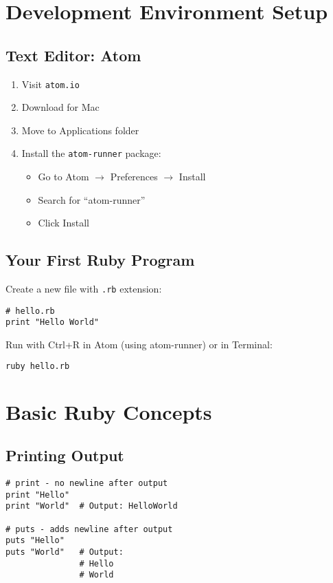\documentclass[12pt,a4paper]{article}
\begin{document}
\section{Development Environment Setup}

\subsection{Text Editor: Atom}
\begin{enumerate}
    \item Visit \texttt{atom.io}
    \item Download for Mac
    \item Move to Applications folder
    \item Install the \texttt{atom-runner} package:
    \begin{itemize}
        \item Go to Atom $\rightarrow$ Preferences $\rightarrow$ Install
        \item Search for ``atom-runner''
        \item Click Install
    \end{itemize}
\end{enumerate}

\subsection{Your First Ruby Program}

Create a new file with \texttt{.rb} extension:

\begin{lstlisting}
# hello.rb
print "Hello World"
\end{lstlisting}

Run with Ctrl+R in Atom (using atom-runner) or in Terminal:
\begin{lstlisting}[language=bash]
ruby hello.rb
\end{lstlisting}

\section{Basic Ruby Concepts}

\subsection{Printing Output}

\begin{lstlisting}
# print - no newline after output
print "Hello"
print "World"  # Output: HelloWorld

# puts - adds newline after output
puts "Hello"
puts "World"   # Output: 
               # Hello
               # World
\end{lstlisting}
\end{document}
